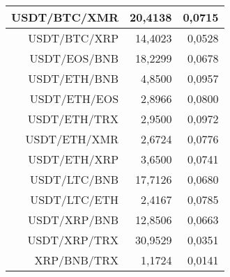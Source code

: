 \begin{table}
\begin{tabular}{|| r | r | r ||}
 \hline USDT/BTC/XMR & 20,4138 & 0,0715\\ 
 \hline USDT/BTC/XRP & 14,4023 & 0,0528\\ 
 \hline USDT/EOS/BNB & 18,2299 & 0,0678\\ 
 \hline USDT/ETH/BNB & 4,8500 & 0,0957\\ 
 \hline USDT/ETH/EOS & 2,8966 & 0,0800\\ 
 \hline USDT/ETH/TRX & 2,9500 & 0,0972\\ 
 \hline USDT/ETH/XMR & 2,6724 & 0,0776\\ 
 \hline USDT/ETH/XRP & 3,6500 & 0,0741\\ 
 \hline USDT/LTC/BNB & 17,7126 & 0,0680\\ 
 \hline USDT/LTC/ETH & 2,4167 & 0,0785\\ 
 \hline USDT/XRP/BNB & 12,8506 & 0,0663\\ 
 \hline USDT/XRP/TRX & 30,9529 & 0,0351\\ 
 \hline XRP/BNB/TRX & 1,1724 & 0,0141\\ 
 \hline
\end{tabular}
\end{table}